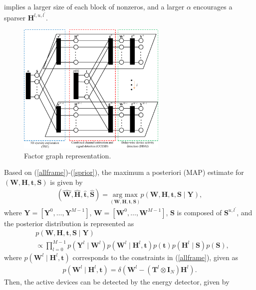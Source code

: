 \documentclass[conference]{IEEEtran}
\begin{document}
implies a larger size of each block of nonzeros, and a larger $\alpha$ encourages a sparser $\mathbf H^{l,u,l^{\prime}}$.
\vspace{-0.3cm}
\begin{figure}[!htb]
	\centering
	\setlength{\belowcaptionskip}{-.3cm}
	\includegraphics[width=2.8in]{factorGraph.pdf}
	\caption{Factor graph representation.}
	\label{Factor}
\end{figure}
Based on (\ref{allframe})-(\ref{sprior}), the maximum a
posteriori (MAP) estimate for $(\mathbf W, \mathbf H, \mathbf t, \mathbf S)$ is given by
\begin{align}
\label{map}
(\hat{\mathbf W}, \hat{\mathbf H}, \hat{\mathbf t} , \hat{\mathbf S})=\underset{(\mathbf W, \mathbf H, \mathbf t, \mathbf S)}{\text{arg max}} p(\mathbf W, \mathbf H, \mathbf t, \mathbf S \mid \mathbf Y),
\end{align}
where $\mathbf Y = [\mathbf Y^0,\dots,\mathbf Y^{M-1}]$, $\mathbf W = [\mathbf W^0,\dots,\mathbf W^{M-1}]$, $\mathbf S$ is composed of $\mathbf S^{u,l^{\prime}}$, and the posterior distribution is represented as
\begin{align}
	\label{post}
	&p(\mathbf W, \mathbf H, \mathbf t, \mathbf S \mid \mathbf Y) \nonumber\\
	&\propto \prod_{l=0}^{M-1} p(\mathbf Y^l \mid \mathbf W^l) p(\mathbf W^l \mid \mathbf H^l, \mathbf t) p(\mathbf t) p(\mathbf H^l \mid \mathbf S) p(\mathbf S),
\end{align}
 where $p(\mathbf W^l \mid \mathbf H^l, \mathbf t)$ corresponds to the constraints in (\ref{allframe}), given as 
 \begin{align}
 	\label{constraint}
 	p(\mathbf W^l \mid \mathbf H^l, \mathbf t) = \delta(\mathbf W^l-(\mathbf T^l \otimes \mathbf I_N)  \mathbf H^l).
 \end{align}
 Then, the active devices can be detected by the energy detector, given by
\end{document}
